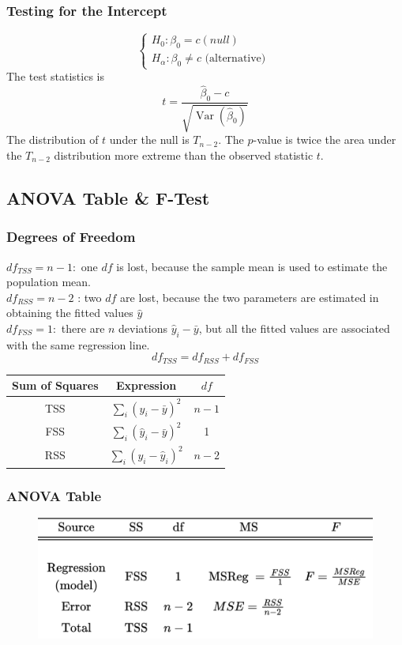 \documentclass[11pt,a4paper]{article}
\begin{document}
\subsubsection{Testing for the Intercept}
$$
\left\{\begin{array}{l}
H_{0}: \beta_{0}=c(n u l l) \\
H_{\alpha}: \beta_{0} \neq c \text { (alternative) }
\end{array}\right.
$$
The test statistics is
$$
t=\frac{\hat{\beta}_{0}-c}{\sqrt{\operatorname{Var}\left(\hat{\beta}_{0}\right)}}
$$
The distribution of $t$ under the null is $T_{n-2}$.
The $p$-value is twice the area under the $T_{n-2}$ distribution more extreme than the observed statistic $t$.

\subsection{ANOVA Table \& F-Test}
\subsubsection{Degrees of Freedom}
$d f_{T S S}=n-1:$ one $d f$ is lost, because the sample mean is used to estimate the population mean.\\
$d f_{R S S}=n-2$ : two $d f$ are lost, because the two parameters are estimated in obtaining the fitted values $\hat{y}$\\
$d f_{F S S}=1:$ there are $n$ deviations $\hat{y}_{i}-\bar{y}$, but all the fitted values are associated with the same regression line.
$$d f_{T S S}=d f_{R S S}+d f_{F S S}$$
\begin{center}
\begin{tabular}{ccc}
\hline Sum of Squares & Expression & $d f$ \\
\hline \hline TSS & $\sum_{i}\left(y_{i}-\bar{y}\right)^{2}$ & $n-1$ \\
FSS & $\sum_{i}\left(\hat{y}_{i}-\bar{y}\right)^{2}$ & 1 \\
RSS & $\sum_{i}\left(y_{i}-\hat{y}_{i}\right)^{2}$ & $n-2$ \\
\hline
\end{tabular}
\end{center}

\subsubsection{ANOVA Table}

\begin{center}\begin{figure}[htbp]
    \centering
    \includegraphics[scale=1]{rendered_image.png}
    \caption{}
    \label{}
\end{figure}\end{center}
\end{document}
